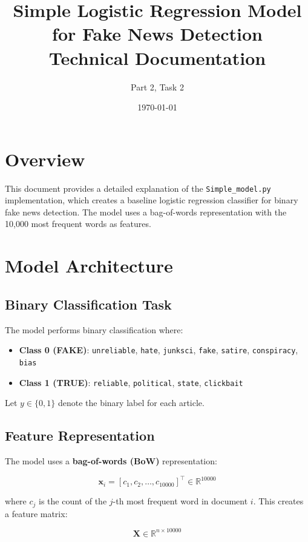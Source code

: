 \documentclass[11pt,a4paper]{article}
\title{Simple Logistic Regression Model for Fake News Detection\\
\large Technical Documentation}
\author{Part 2, Task 2}
\date{\today}
\begin{document}
\maketitle

\section{Overview}

This document provides a detailed explanation of the \texttt{Simple\_model.py} implementation, which creates a baseline logistic regression classifier for binary fake news detection. The model uses a bag-of-words representation with the 10,000 most frequent words as features.

\section{Model Architecture}

\subsection{Binary Classification Task}

The model performs binary classification where:
\begin{itemize}
    \item \textbf{Class 0 (FAKE)}: \texttt{unreliable}, \texttt{hate}, \texttt{junksci}, \texttt{fake}, \texttt{satire}, \texttt{conspiracy}, \texttt{bias}
    \item \textbf{Class 1 (TRUE)}: \texttt{reliable}, \texttt{political}, \texttt{state}, \texttt{clickbait}
\end{itemize}

Let $y \in \{0, 1\}$ denote the binary label for each article.

\subsection{Feature Representation}

The model uses a \textbf{bag-of-words (BoW)} representation:

\begin{equation}
\mathbf{x}_i = [c_1, c_2, \ldots, c_{10000}]^\top \in \mathbb{R}^{10000}
\end{equation}

where $c_j$ is the count of the $j$-th most frequent word in document $i$. This creates a feature matrix:

\begin{equation}
\mathbf{X} \in \mathbb{R}^{n \times 10000}
\end{equation}
\end{document}
